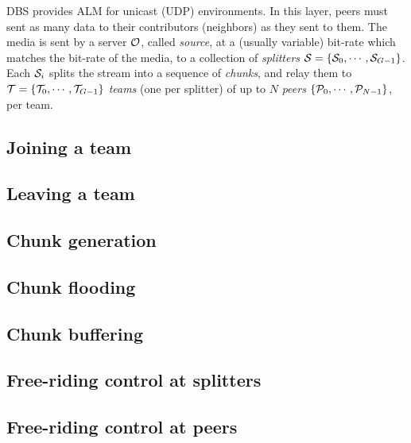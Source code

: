 %
%

DBS provides ALM for unicast (UDP) environments. {\color{red} In this
  layer, peers must sent as many data to their contributors
  (neighbors) as they sent to them.} The media is sent by a server
${\cal O}$, called \emph{source}, at a (usually variable) bit-rate
which matches the bit-rate of the media, to a collection of
\emph{splitters} ${\cal S}=\{{\cal S}_0, \cdots, {\cal
  S}_{G-1}\}$. Each ${\cal S}_i$ splits the stream into a sequence of
\emph{chunks}, and relay them to ${\cal T}=\{{\cal T}_0,\cdots,{\cal
  T}_{G-1}\}$ \emph{teams} (one per splitter) of up to $N$
\emph{peers} $\{{\cal P}_0,\cdots,{\cal P}_{N-1}\}$, per team.

\subsection{Joining a team}
\label{dbs:joining}


\subsection{Leaving a team}
\label{dbs:leaving}


\subsection{Chunk generation}
\label{dbs:chunk_generation}


\subsection{Chunk flooding}
\label{dbs:chunk_flooding}


\subsection{Chunk buffering}
\label{dbs:chunk_buffering}


\subsection{Free-riding control at splitters}
\label{dbs:frcS}


\subsection{Free-riding control at peers} %
\label{dbs:frcp}


